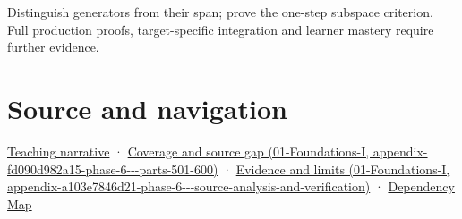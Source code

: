 Distinguish generators from their span; prove the one-step subspace criterion. Full production proofs, target-specific integration and learner mastery require further evidence.

\section{Source and navigation}\label{appendix-173b52c063ae-source-and-navigation}

\href{Continuous\%20Notes/Computing\%20Foundations\%20-\%20From\%20Bits\%20to\%20C++\%20and\%20Systems\%20APIs\#The\%20reachable\%20movements\%20form\%20a\%20vector\%20space}{Teaching narrative} · \href{../01-Foundations-I/main.pdf\#nameddest=appendix-fd090d982a15-phase-6---parts-501-600}{Coverage and source gap (01-Foundations-I, appendix-fd090d982a15-phase-6-\/-\/-parts-501-600)} · \href{../01-Foundations-I/main.pdf\#nameddest=appendix-a103e7846d21-phase-6---source-analysis-and-verification}{Evidence and limits (01-Foundations-I, appendix-a103e7846d21-phase-6-\/-\/-source-analysis-and-verification)} · \hyperref[appendix-4ad47bdd269a]{Dependency Map}
